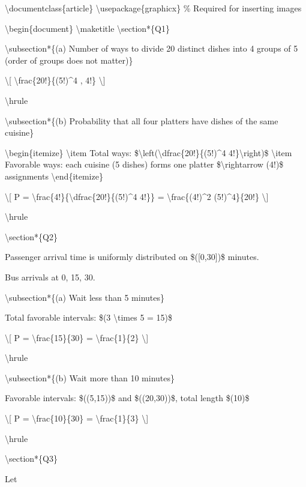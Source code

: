 \textbackslash documentclass\{article\}
\textbackslash usepackage\{graphicx\} \% Required for inserting images

\textbackslash begin\{document\} \textbackslash maketitle
\textbackslash section*\{Q1\}

\textbackslash subsection*\{(a) Number of ways to divide 20 distinct
dishes into 4 groups of 5 (order of groups does not matter)\}

\textbackslash{[} \textbackslash frac\{20!\}\{(5!)\^{}4 , 4!\}
\textbackslash{]}

\textbackslash hrule

\textbackslash subsection*\{(b) Probability that all four platters have
dishes of the same cuisine\}

\textbackslash begin\{itemize\} \textbackslash item Total ways:
\$\textbackslash left(\textbackslash dfrac\{20!\}\{(5!)\^{}4
4!\}\textbackslash right)\$ \textbackslash item Favorable ways: each
cuisine (5 dishes) forms one platter \$\textbackslash rightarrow (4!)\$
assignments \textbackslash end\{itemize\}

\textbackslash{[} P =
\textbackslash frac\{4!\}\{\textbackslash dfrac\{20!\}\{(5!)\^{}4 4!\}\}
= \textbackslash frac\{(4!)\^{}2 (5!)\^{}4\}\{20!\} \textbackslash{]}

\textbackslash hrule

\textbackslash section*\{Q2\}

Passenger arrival time is uniformly distributed on \$({[}0,30{]})\$
minutes.

Bus arrivals at 0, 15, 30.

\textbackslash subsection*\{(a) Wait less than 5 minutes\}

Total favorable intervals: \$(3 \textbackslash times 5 = 15)\$

\textbackslash{[} P = \textbackslash frac\{15\}\{30\} =
\textbackslash frac\{1\}\{2\} \textbackslash{]}

\textbackslash hrule

\textbackslash subsection*\{(b) Wait more than 10 minutes\}

Favorable intervals: \$((5,15))\$ and \$((20,30))\$, total length
\$(10)\$

\textbackslash{[} P = \textbackslash frac\{10\}\{30\} =
\textbackslash frac\{1\}\{3\} \textbackslash{]}

\textbackslash hrule

\textbackslash section*\{Q3\}

Let

